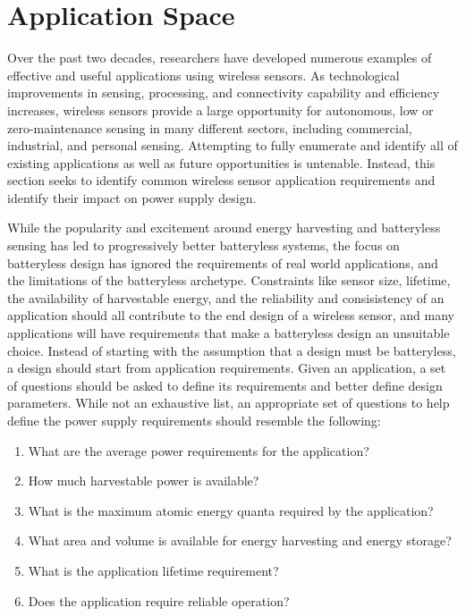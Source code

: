 \section{Application Space}
Over the past two decades, researchers have developed numerous examples of effective and useful applications using wireless sensors.
As technological improvements in sensing, processing, and connectivity capability and efficiency increases, wireless sensors provide a large opportunity for autonomous, low or zero-maintenance sensing in many different sectors, including commercial, industrial, and personal sensing.
Attempting to fully enumerate and identify all of existing applications as well as future opportunities is untenable.
Instead, this section seeks to identify common wireless sensor application requirements and identify their impact on power supply design.

While the popularity and excitement around energy harvesting and batteryless sensing has led to progressively better batteryless systems, the focus on batteryless design has ignored the requirements of real world applications, and the limitations of the batteryless archetype.
Constraints like sensor size, lifetime, the availability of harvestable energy, and the reliability and consisistency of an application should all contribute to the end design of a wireless sensor, and many applications will have requirements that make a batteryless design an unsuitable choice.
Instead of starting with the assumption that a design must be batteryless, a design should start from application requirements. Given an application, a set of questions should be asked to define its requirements and better define design parameters.
While not an exhaustive list, an appropriate set of questions to help define the power supply requirements should resemble the following:

\begin{enumerate}
    \item What are the average power requirements for the application?
    \item How much harvestable power is available?
    \item What is the maximum atomic energy quanta required by the application?
    \item What area and volume is available for energy harvesting and energy storage?
    \item What is the application lifetime requirement?
    \item Does the application require reliable operation?
\end{enumerate}

